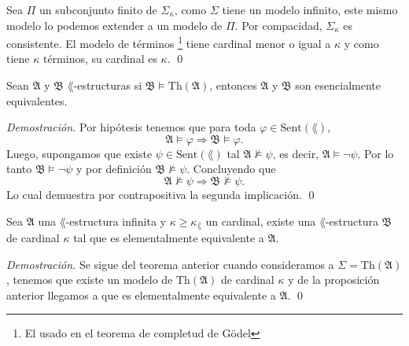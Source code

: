 Sea $\Pi$ un subconjunto finito de $\Sigma_\kappa$, como $\Sigma$ tiene un modelo infinito, este mismo modelo lo podemos extender a un modelo de $\Pi$. 
Por compacidad, $\Sigma_\kappa$ es consistente.
El modelo de t\'erminos
\footnote{El usado en el teorema de completud de G\"odel}
tiene cardinal menor o igual a $\kappa$ y como tiene $\kappa$ t\'erminos, su cardinal es $\kappa$. \qed
\newpage
\begin{proposition}
  Sean $\mathfrak{A}$ y $\mathfrak{B}$ $\lang$-estructuras si $\mathfrak{B} \models \mathrm{Th} (\mathfrak{A})$, entonces $\mathfrak{A}$ y $\mathfrak{B}$ son esencialmente equivalentes.
\end{proposition} \hfill \break
\emph{Demostraci\'on.} \hfill \break
Por hip\'otesis tenemos que para toda $\varphi \in \mathrm{Sent} (\lang)$, 
\[ \mathfrak{A} \models \varphi \Longrightarrow \mathfrak{B} \models \varphi. \]
Luego, supongamos que existe $\psi \in \mathrm{Sent} (\lang)$ tal $\mathfrak{A} \not\models \psi$, es decir, $\mathfrak{A} \models \neg \psi$.
Por lo tanto $\mathfrak{B} \models \neg \psi$ y por definici\'on $\mathfrak{B} \not\models \psi$.
Concluyendo que 
\[ \mathfrak{A} \not \models \psi \Longrightarrow \mathfrak{B} \not\models \psi. \]
Lo cual demuestra por contrapositiva la segunda implicaci\'on. \qed
\begin{corollary}
  Sea $\mathfrak{A}$ una $\lang$-estructura infinita y $\kappa \geq \kappa_\lang$ un cardinal, existe una $\lang$-estructura $\mathfrak{B}$ de cardinal $\kappa$ tal que es elementalmente equivalente a $\mathfrak{A}$.
\end{corollary} \hfill \break
\emph{Demostraci\'on.} \hfill \break
Se sigue del teorema anterior cuando consideramos a $\Sigma = \mathrm{Th} (\mathfrak{A})$, tenemos que existe un modelo de $\mathrm{Th} (\mathfrak{A})$ de cardinal $\kappa$ y de la proposici\'on anterior llegamos a que es elementalmente equivalente a $\mathfrak{A}$. \qed

